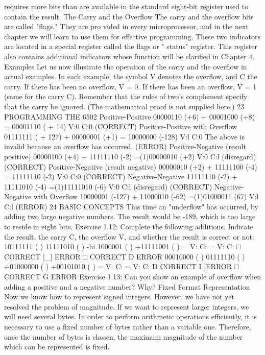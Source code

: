 \documentclass{book}
\begin{document}
requires more bits than are available in the standard eight-bit
register used to contain the result.
The Carry and the Overflow
The carry and the overflow bits are called "flags." They are pro
vided in every microprocessor, and in the next chapter we will
learn to use them for effective programming. These two indicators
are located in a special register called the flags or " status"
register. This register also contains additional indicators whose
function will be clarified in Chapter 4.
Examples
Let us now illustrate the operation of the carry and the overflow
in actual examples. In each example, the symbol V denotes the
overflow, and C the carry.
If there has been no overflow, V = 0. If there has been an
overflow, V = 1 (same for the carry C). Remember that the rules of
two's complement specify that the carry be ignored. (The
mathematical proof is not supplied here.)
23
PROGRAMMING THE 6502
Positive-Positive
00000110 (+6)
+ 00001000 (+8)
= 00001110 ( + 14) V:0 C:0
(CORRECT)
Positive-Positive with Overflow
01111111 ( + 127)
+ 00000001 (+1)
= 10000000 (-128) V:l C:0
The above is invalid because an overflow has occurred.
(ERROR)
Positive-Negative (result positive)
00000100 (+4)
+ 11111110 (-2)
=(1)00000010 (+2) V:0 C:l (disregard)
(CORRECT)
Positive-Negative (result negative)
00000010 (+2)
+ 11111100 (-4)
= 11111110 (-2) V:0 C:0
(CORRECT)
Negative-Negative
11111110 (-2)
+ 11111010 (-4)
=(1)11111010 (-6) V:0 C:l (disregard)
(CORRECT)
Negative-Negative with Overflow
10000001 (-127)
+ 11000010 (-62)
=(1)01000011 (67) V:l C:l
(ERROR)
24
BASIC CONCEPTS
This time an "underflow" has occurred, by adding two large
negative numbers. The result would be -189, which is too large to
reside in eight bits.
Exercise 1.12: Complete the following additions. Indicate the
result, the carry C, the overflow V, and whether the result is correct
or not:
10111111 ( ) 11111010 ( )
-hi 1000001 ( ) +11111001 ( )
= V: C: = V: C:
□ CORRECT [_] ERROR □ CORRECT D ERROR
00010000 ( ) 01111110 ( )
+01000000 ( ) +00101010 ( )
= V: C: = V: C:
D CORRECT I ]ERROR □ CORRECT G ERROR
Exercise 1.13: Can you show an example of overflow when adding a
positive and a negative number? Why?
Fixed Format Representation
Now we know how to represent signed integers. However, we
have not yet resolved the problem of magnitude. If we want to
represent larger integers, we will need several bytes. In order to
perform arithmetic operations efficiently, it is necessary to use a
fixed number of bytes rather than a variable one. Therefore, once
the number of bytes is chosen, the maximum magnitude of the
number which can be represented is fixed.
\end{document}
